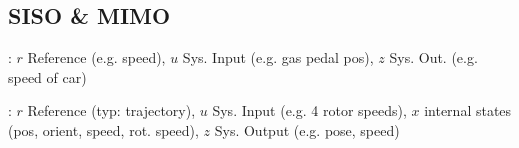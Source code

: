 \subsection{SISO \& MIMO}
: $r$ Reference (e.g. speed), $u$ Sys. Input (e.g. gas pedal pos),
$z$ Sys. Out. (e.g. speed of car)

: $r$ Reference (typ: trajectory), $u$ Sys. Input (e.g. 4 rotor speeds),
$x$ internal states (pos, orient, speed, rot. speed), $z$ Sys. Output (e.g. pose, speed)
